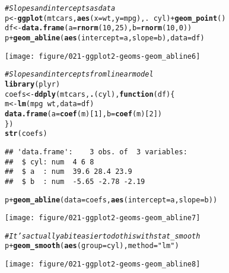 \documentclass[a4paper,titlepage]{tufte-handout}\usepackage[]{graphicx}\usepackage[]{color}
\makeatletter
\def\maxwidth{ %
  \ifdim\Gin@nat@width>\linewidth
    \linewidth
  \else
    \Gin@nat@width
  \fi
}
\newcommand{\hlnum}[1]{\textcolor[rgb]{0.686,0.059,0.569}{#1}}%
\newcommand{\hlstr}[1]{\textcolor[rgb]{0.192,0.494,0.8}{#1}}%
\newcommand{\hlcom}[1]{\textcolor[rgb]{0.678,0.584,0.686}{\textit{#1}}}%
\newcommand{\hlopt}[1]{\textcolor[rgb]{0,0,0}{#1}}%
\newcommand{\hlstd}[1]{\textcolor[rgb]{0.345,0.345,0.345}{#1}}%
\newcommand{\hlkwa}[1]{\textcolor[rgb]{0.161,0.373,0.58}{\textbf{#1}}}%
\newcommand{\hlkwb}[1]{\textcolor[rgb]{0.69,0.353,0.396}{#1}}%
\newcommand{\hlkwc}[1]{\textcolor[rgb]{0.333,0.667,0.333}{#1}}%
\newcommand{\hlkwd}[1]{\textcolor[rgb]{0.737,0.353,0.396}{\textbf{#1}}}%
\newenvironment{kframe}{%
 \def\at@end@of@kframe{}%
 \ifinner\ifhmode%
  \def\at@end@of@kframe{\end{minipage}}%
  \begin{minipage}{\columnwidth}%
 \fi\fi%
 \def\FrameCommand##1{\hskip\@totalleftmargin \hskip-\fboxsep
 \colorbox{shadecolor}{##1}\hskip-\fboxsep
     \hskip-\linewidth \hskip-\@totalleftmargin \hskip\columnwidth}%
 \MakeFramed {\advance\hsize-\width
   \@totalleftmargin\z@ \linewidth\hsize
   \@setminipage}}%
 {\par\unskip\endMakeFramed%
 \at@end@of@kframe}
\newenvironment{knitrout}{}{} %
\makeatother
\begin{document}
\begin{knitrout}
\begin{kframe}
\begin{alltt}
\hlcom{# Slopes and intercepts as data}
\hlstd{p} \hlkwb{<-} \hlkwd{ggplot}\hlstd{(mtcars,} \hlkwd{aes}\hlstd{(}\hlkwc{x} \hlstd{= wt,} \hlkwc{y}\hlstd{=mpg), .} \hlopt{~} \hlstd{cyl)} \hlopt{+} \hlkwd{geom_point}\hlstd{()}
\hlstd{df} \hlkwb{<-} \hlkwd{data.frame}\hlstd{(}\hlkwc{a}\hlstd{=}\hlkwd{rnorm}\hlstd{(}\hlnum{10}\hlstd{,} \hlnum{25}\hlstd{),} \hlkwc{b}\hlstd{=}\hlkwd{rnorm}\hlstd{(}\hlnum{10}\hlstd{,} \hlnum{0}\hlstd{))}
\hlstd{p} \hlopt{+} \hlkwd{geom_abline}\hlstd{(}\hlkwd{aes}\hlstd{(}\hlkwc{intercept}\hlstd{=a,} \hlkwc{slope}\hlstd{=b),} \hlkwc{data}\hlstd{=df)}
\end{alltt}
\end{kframe}
\texttt{[image: figure/021-ggplot2-geoms-geom\_abline6]} 
\begin{kframe}\begin{alltt}
\hlcom{# Slopes and intercepts from linear model}
\hlkwd{library}\hlstd{(plyr)}
\hlstd{coefs} \hlkwb{<-} \hlkwd{ddply}\hlstd{(mtcars,} \hlkwd{.}\hlstd{(cyl),} \hlkwa{function}\hlstd{(}\hlkwc{df}\hlstd{) \{}
  \hlstd{m} \hlkwb{<-} \hlkwd{lm}\hlstd{(mpg} \hlopt{~} \hlstd{wt,} \hlkwc{data}\hlstd{=df)}
  \hlkwd{data.frame}\hlstd{(}\hlkwc{a} \hlstd{=} \hlkwd{coef}\hlstd{(m)[}\hlnum{1}\hlstd{],} \hlkwc{b} \hlstd{=} \hlkwd{coef}\hlstd{(m)[}\hlnum{2}\hlstd{])}
\hlstd{\})}
\hlkwd{str}\hlstd{(coefs)}
\end{alltt}
\begin{verbatim}
## 'data.frame':	3 obs. of  3 variables:
##  $ cyl: num  4 6 8
##  $ a  : num  39.6 28.4 23.9
##  $ b  : num  -5.65 -2.78 -2.19
\end{verbatim}
\begin{alltt}
\hlstd{p} \hlopt{+} \hlkwd{geom_abline}\hlstd{(}\hlkwc{data}\hlstd{=coefs,} \hlkwd{aes}\hlstd{(}\hlkwc{intercept}\hlstd{=a,} \hlkwc{slope}\hlstd{=b))}
\end{alltt}
\end{kframe}
\texttt{[image: figure/021-ggplot2-geoms-geom\_abline7]} 
\begin{kframe}\begin{alltt}
\hlcom{# It's actually a bit easier to do this with stat_smooth}
\hlstd{p} \hlopt{+} \hlkwd{geom_smooth}\hlstd{(}\hlkwd{aes}\hlstd{(}\hlkwc{group}\hlstd{=cyl),} \hlkwc{method}\hlstd{=}\hlstr{"lm"}\hlstd{)}
\end{alltt}
\end{kframe}
\texttt{[image: figure/021-ggplot2-geoms-geom\_abline8]} 
\begin{kframe}\begin{alltt}

\end{alltt}
\end{kframe}
\end{knitrout}
\end{document}
